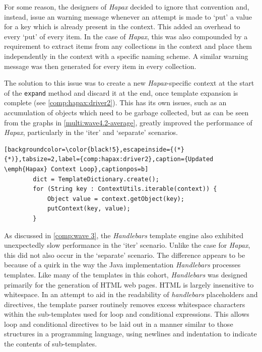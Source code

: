 For some reason, the designers of \emph{Hapax} decided to ignore that convention and, instead, issue an warning message whenever an attempt is made to `put' a value for a key which is already present in the context. This added an overhead to every `put' of every item. In the case of \emph{Hapax}, this was also compounded by a requirement to extract items from any collections in the context and place them independently in the context with a specific naming scheme. A similar warning message was then generated for every item in every collection.

The solution to this issue was to create a new \emph{Hapax}-specific context at the start of the \verb!expand! method and discard it at the end, once template expansion is complete (see \autoref{comp:hapax:driver2}). This has its own issues, such as an accumulation of objects which need to be garbage collected, but as can be seen from the graphs in \autoref{multi:wave4.2-average}, greatly improved the performance of \emph{Hapax}, particularly in the `iter' and `separate' scenarios.

\begin{lstlisting}[backgroundcolor=\color{black!5},escapeinside={(*}{*)},tabsize=2,label={comp:hapax:driver2},caption={Updated \emph{Hapax} Context Loop},captionpos=b]
        dict = TemplateDictionary.create();
        for (String key : ContextUtils.iterable(context)) {
            Object value = context.getObject(key);
            putContext(key, value);
        }
\end{lstlisting}

As discussed in \autoref{comp:wave 3}, the \emph{Handlebars} template engine also exhibited unexpectedly slow performance in the `iter' scenario. Unlike the case for \emph{Hapax}, this did not also occur in the `separate' scenario. The difference appears to be because of a quirk in the way the Java implementation \emph{Handlebars} processes templates. Like many of the templates in this cohort, \emph{Handlebars} was designed primarily for the generation of HTML web pages. HTML is largely insensitive to whitespace. In an attempt to aid in the readability of \emph{handlebars} placeholders and directives, the template parser routinely removes excess whitespace characters within the sub-templates used for loop and conditional expressions. This allows loop and conditional directives to be laid out in a manner similar to those structures in a programming language, using newlines and indentation to indicate the contents of sub-templates.

